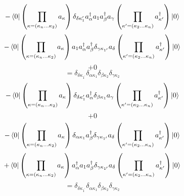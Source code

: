 \documentclass[12pt]{article}
\begin{document}
\begin{equation}
    -\bra{0}\left(\prod_{\kappa=\left(\kappa_{n}\dots\kappa_{2}\right)}a_{\kappa}\right)
        \delta _{\delta  \kappa _{1}^{\prime}}a^{\dag}_{\alpha }a_{1}a^{\dag}_{\beta }a_{\gamma }
    \left(\prod_{\kappa^{\prime}=\left(\kappa_{2}\dots\kappa_{n}\right)}a^{\dag}_{\kappa^{\prime}}\right)\ket{0}
\end{equation}
\begin{equation}
    -\bra{0}\left(\prod_{\kappa=\left(\kappa_{n}\dots\kappa_{2}\right)}a_{\kappa}\right)
        a_{1}a^{\dag}_{\alpha }a^{\dag}_{\beta }\delta _{\gamma  \kappa _{1^{\prime}}}a_{\delta }
    \left(\prod_{\kappa^{\prime}=\left(\kappa_{2}\dots\kappa_{n}\right)}a^{\dag}_{\kappa^{\prime}}\right)\ket{0}
\end{equation}
\begin{equation}
    +0
\end{equation}
\begin{equation}
    =\delta _{\delta  \kappa _{1^{\prime}}}\delta _{\alpha  \kappa _{1}}\delta _{\beta  \kappa _{2}}\delta _{\gamma  \kappa _{2}}
\end{equation}
\begin{equation}
    -\bra{0}\left(\prod_{\kappa=\left(\kappa_{n}\dots\kappa_{2}\right)}a_{\kappa}\right)
        \delta _{\delta  \kappa _{1}^{\prime}}a^{\dag}_{\alpha }\delta _{\beta  \kappa _{1}}a_{\gamma }
    \left(\prod_{\kappa^{\prime}=\left(\kappa_{2}\dots\kappa_{n}\right)}a^{\dag}_{\kappa^{\prime}}\right)\ket{0}
\end{equation}
\begin{equation}
    +0
\end{equation}
\begin{equation}
    -\bra{0}\left(\prod_{\kappa=\left(\kappa_{n}\dots\kappa_{2}\right)}a_{\kappa}\right)
        \delta _{\alpha  \kappa _{1}}a^{\dag}_{\beta }\delta _{\gamma  \kappa _{1^{\prime}}}a_{\delta }
    \left(\prod_{\kappa^{\prime}=\left(\kappa_{2}\dots\kappa_{n}\right)}a^{\dag}_{\kappa^{\prime}}\right)\ket{0}
\end{equation}
\begin{equation}
    +\bra{0}\left(\prod_{\kappa=\left(\kappa_{n}\dots\kappa_{2}\right)}a_{\kappa}\right)
        a^{\dag}_{\alpha }a_{1}a^{\dag}_{\beta }\delta _{\gamma  \kappa _{1^{\prime}}}a_{\delta }
    \left(\prod_{\kappa^{\prime}=\left(\kappa_{2}\dots\kappa_{n}\right)}a^{\dag}_{\kappa^{\prime}}\right)\ket{0}
\end{equation}
\begin{equation}
    =\delta _{\delta  \kappa _{1^{\prime}}}\delta _{\alpha  \kappa _{1}}\delta _{\beta  \kappa _{2}}\delta _{\gamma  \kappa _{2}}
\end{equation}
\end{document}
